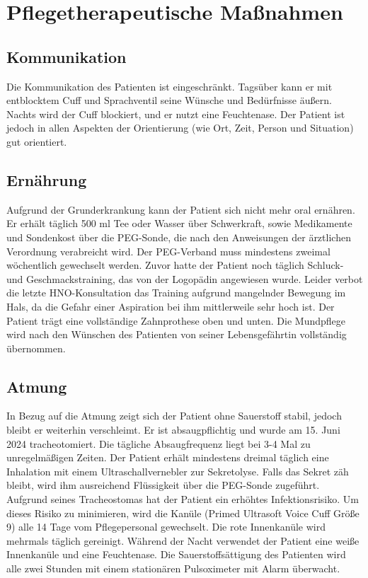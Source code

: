 \documentclass[a4paper,12pt]{article}
\begin{document}
\section{Pflegetherapeutische Maßnahmen}

\subsection{Kommunikation}
Die Kommunikation des Patienten ist eingeschränkt. Tagsüber kann er mit entblocktem
Cuff und Sprachventil seine Wünsche und Bedürfnisse äußern. Nachts wird der Cuff
blockiert, und er nutzt eine Feuchtenase. Der Patient ist jedoch in allen Aspekten der
Orientierung (wie Ort, Zeit, Person und Situation) gut orientiert.

\subsection{Ernährung}
Aufgrund der Grunderkrankung kann der Patient sich nicht mehr oral ernähren. Er erhält
täglich 500 ml Tee oder Wasser über Schwerkraft, sowie Medikamente und Sondenkost über
die PEG-Sonde, die nach den Anweisungen der ärztlichen Verordnung verabreicht wird. Der
PEG-Verband muss mindestens zweimal wöchentlich gewechselt werden. Zuvor hatte der Patient
noch täglich Schluck- und Geschmackstraining, das von der Logopädin angewiesen wurde.
Leider verbot die letzte HNO-Konsultation das Training aufgrund mangelnder Bewegung im Hals,
da die Gefahr einer Aspiration bei ihm mittlerweile sehr hoch ist. Der Patient trägt eine
vollständige Zahnprothese oben und unten. Die Mundpflege wird nach den Wünschen des Patienten
von seiner Lebensgefährtin vollständig übernommen.

\subsection{Atmung}
In Bezug auf die Atmung zeigt sich der Patient ohne Sauerstoff stabil, jedoch bleibt er weiterhin
verschleimt. Er ist absaugpflichtig und wurde am 15. Juni 2024 tracheotomiert. Die tägliche
Absaugfrequenz liegt bei 3-4 Mal zu unregelmäßigen Zeiten. Der Patient erhält mindestens dreimal
täglich eine Inhalation mit einem Ultraschallvernebler zur Sekretolyse. Falls das Sekret zäh
bleibt, wird ihm ausreichend Flüssigkeit über die PEG-Sonde zugeführt. Aufgrund seines Tracheostomas
hat der Patient ein erhöhtes Infektionsrisiko. Um dieses Risiko zu minimieren, wird die Kanüle (Primed
Ultrasoft Voice Cuff Größe 9) alle 14 Tage vom Pflegepersonal gewechselt. Die rote Innenkanüle wird
mehrmals täglich gereinigt. Während der Nacht verwendet der Patient eine weiße Innenkanüle und eine
Feuchtenase. Die Sauerstoffsättigung des Patienten wird alle zwei Stunden mit einem stationären
Pulsoximeter mit Alarm überwacht.
\end{document}
